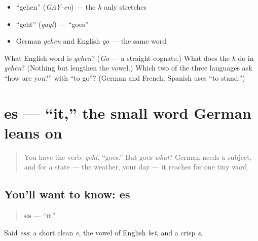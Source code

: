 \begin{itemize}
\raggedright
  \item \textquotedblleft{}gehen\textquotedblright{} (\emph{GAY-en}) — the \emph{h} only stretches
  \item \textquotedblleft{}geht\textquotedblright{} (\emph{gayt}) — \textquotedblleft{}goes\textquotedblright{}
  \item German \emph{gehen} and English \emph{go} — the same word
\end{itemize}

\begin{tcolorbox}[breakable,colback=teal!4,colframe=teal!35!black,title={Before you move on}]
What English word is \emph{gehen}? (\emph{Go} — a straight cognate.) What does the \emph{h} do in \emph{gehen}? (Nothing but lengthen the vowel.) Which two of the three languages ask \textquotedblleft{}how are you?\textquotedblright{} with \textquotedblleft{}to go\textquotedblright{}? (German and French; Spanish uses \textquotedblleft{}to stand.\textquotedblright{})
\end{tcolorbox}
\section[es]{es — \textquotedblleft{}it,\textquotedblright{} the small word German leans on}

\label{lesson:GE-C03-es}



\begin{quote}
You have the verb: \emph{geht}, \textquotedblleft{}goes.\textquotedblright{} But goes \emph{what}? German needs a subject, and for a state — the weather, your day — it reaches for one tiny word.
\end{quote}

\subsection*{You'll want to know: es}
\begin{quote}
\textbf{es} — \textquotedblleft{}it.\textquotedblright{}
\end{quote}

Said \emph{ess}: a short clean \emph{e}, the vowel of English \emph{bet}, and a crisp \emph{s}.

